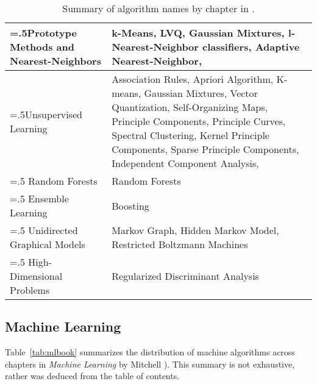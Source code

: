 \documentclass[a4paper, 11pt]{article}
\begin{document}
\begin{table}[ht]
\begin{tabularx}{\textwidth}{>{\hsize=.5\hsize}XX}
		\midrule
		Prototype Methods and Nearest-Neighbors & k-Means, LVQ, Gaussian Mixtures, l-Nearest-Neighbor classifiers, Adaptive Nearest-Neighbor, \\
		\midrule
		Unsupervised Learning & Association Rules, Apriori Algorithm, K-means, Gaussian Mixtures, Vector Quantization, Self-Organizing Maps, Principle Components, Principle Curves, Spectral Clustering, Kernel Principle Components, Sparse Principle Components, Independent Component Analysis,  \\
		\midrule
		Random Forests & Random Forests \\
		\midrule
		Ensemble Learning & Boosting \\
		\midrule		
		Unidirected Graphical Models & Markov Graph, Hidden Markov Model, Restricted Boltzmann Machines \\
		\midrule
		High-Dimensional Problems & Regularized Discriminant Analysis \\
		\bottomrule
		\end{tabularx}	
	\caption{Summary of algorithm names by chapter in .}
	\label{tab:teofl}
\end{table}

\subsection{Machine Learning}
Table~\ref{tab:mlbook} summarizes the distribution of machine algorithms across chapters in \emph{Machine Learning} by Mitchell \cite{Mitchell1997}). This summary is not exhaustive, rather was deduced from the table of contents. 
\end{document}
